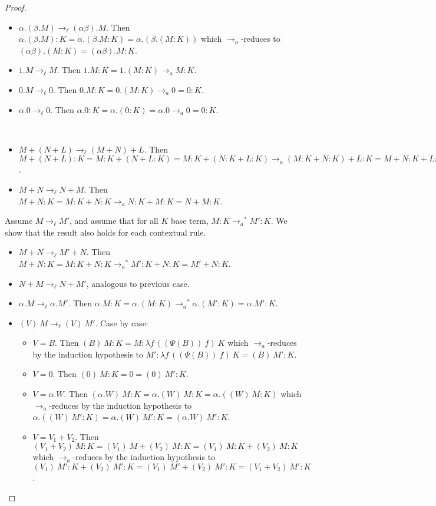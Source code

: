 \documentclass{LMCS}
\newcommand{\lalin}{\ensuremath{\lambda_{{\it lin}}}}
\newcommand{\xto}[1]{\ensuremath{\rightarrow_{#1}}}
\newcommand{\tolinred}{\xto{\ell}}
\newcommand{\toalgred}{\xto{a}}
\newcommand{\stoalgred}{\ensuremath{\xto{a}^{\ast}}}
\begin{document}
\begin{proof}
\begin{description}
\begin{itemize}
	\item $\alpha.(\beta.M)\tolinred(\alpha\beta).M$. Then  $\alpha.(\beta.M):K=\alpha.(\beta.M:K)=\alpha.(\beta.(M:K))$ which $\toalgred$-reduces to $(\alpha\beta).(M:K)=(\alpha\beta).M:K$.
	\item $1.M\tolinred M$. Then $1.M:K=1.(M:K)\toalgred M:K$.
	\item $0.M\tolinred 0$. Then  $0.M:K=0.(M:K)\toalgred 0=0:K$.
	\item $\alpha.0\tolinred 0$. Then  $\alpha.0:K=\alpha.(0:K)=\alpha.0\toalgred 0=0:K$.
      \end{itemize}
    \item[Rules $Asso$ and $Com$]~
      \begin{itemize}
	\item $M+(N+L)\tolinred (M+N)+L$. Then $M+(N+L):K=M:K+(N+L:K)=M:K+(N:K+L:K)\toalgred (M:K+N:K)+L:K=M+N:K+L:K=(M+N)+L:K$.
	\item $M+N\tolinred N+M$. Then $M+N:K=M:K+N:K\toalgred N:K+M:K=N+M:K$.
      \end{itemize}
    \item[Rules $\xi$ and $\xi_{\lalin}$] Assume $M\tolinred M'$, and assume that for all $K$ base term, $M:K\stoalgred M':K$. We show that the result also holds for each contextual rule.
      \begin{itemize}
	\item $M+N\tolinred M'+N$. Then $M+N:K=M:K+N:K\stoalgred M':K+N:K=M'+N:K$.
	\item $N+M\tolinred N+M'$, analogous to previous case.
	\item $\alpha.M\tolinred\alpha.M'$. Then $\alpha.M:K=\alpha.(M:K)\stoalgred \alpha.(M':K)=\alpha.M':K$.
	\item $(V)~M\tolinred (V)~M'$. Case by case:
	  \begin{itemize}
	    \item $V=B$.  Then $(B)~M:K = M: \lambda f\,((\Psi(B))~f)~K$ which $\toalgred$-reduces by the induction hypothesis to $M': \lambda f\,((\Psi(B))~f)~K =(B)~M': K$.
	    \item $V=0$. Then $(0)~M:K = 0 = (0)~M':K$.
	    \item $V=\alpha.W$. Then $(\alpha.W)~M  : K = \alpha.(W)~M : K=\alpha.((W)~M :K)$  which $\toalgred $-reduces by the induction hypothesis to $\alpha.((W)~M':K) = \alpha.(W)~M':K=(\alpha.W)~M':K$.
	    \item $V=V_1+V_2$. Then $(V_1+V_2)~M  : K = (V_1)~M  + (V_2)~M: K= (V_1)~M : K + (V_2)~M: K$  which $\toalgred $-reduces by the induction hypothesis to $(V_1)~M' : K + (V_2)~M': K= (V_1)~M'+(V_2)~M':K=(V_1+V_2)~M' : K$.

\end{itemize}
\end{itemize}
\end{description}
\end{proof}
\end{document}
